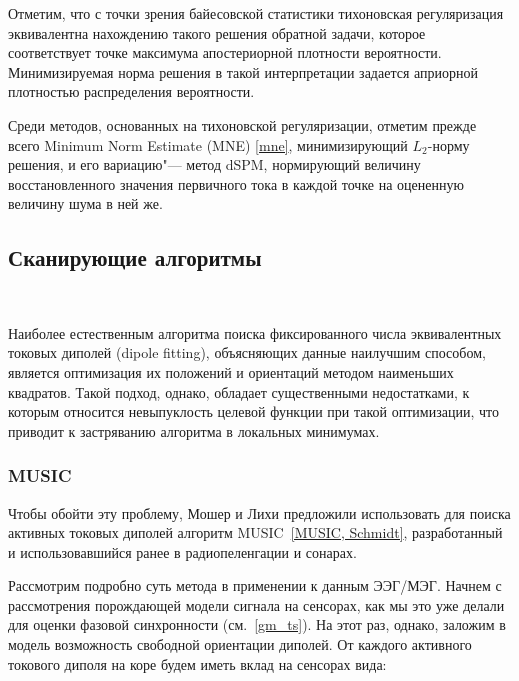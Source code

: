Отметим, что с точки зрения байесовской статистики тихоновская регуляризация
эквивалентна нахождению такого решения обратной задачи, которое соответствует
точке максимума апостериорной плотности вероятности. Минимизируемая норма решения в такой
интерпретации задается априорной плотностью распределения вероятности.

Среди методов, основанных на тихоновской регуляризации, отметим прежде всего
Minimum Norm Estimate (MNE) \ref{mne}, минимизирующий $L_2$-норму решения,
и его вариацию"--- метод dSPM, нормирующий величину восстановленного значения первичного
тока в каждой точке на оцененную величину шума в ней же.

\subsection{Сканирующие алгоритмы}~\label{sect_dics}


Наиболее естественным алгоритма поиска фиксированного числа эквивалентных
токовых диполей (dipole fitting), объясняющих данные наилучшим способом,
является оптимизация их положений и ориентаций методом наименьших квадратов.
Такой подход, однако, обладает существенными недостатками, к которым относится
невыпуклость целевой функции при такой оптимизации,
что приводит к застряванию алгоритма в локальных минимумах.

\subsubsection{MUSIC}
Чтобы обойти эту проблему, Мошер и Лихи предложили использовать для
поиска активных токовых диполей алгоритм MUSIC~\ref{MUSIC, Schmidt}, разработанный
и использовавшийся ранее в радиопеленгации и сонарах.

Рассмотрим подробно суть метода в применении к данным ЭЭГ/МЭГ.
Начнем с рассмотрения порождающей модели сигнала на сенсорах, как мы это
уже делали для оценки фазовой синхронности (см.~\ref{gm_ts}).
На этот раз, однако, заложим в модель возможность свободной ориентации диполей.
От каждого активного токового диполя на коре будем иметь вклад на сенсорах вида:

